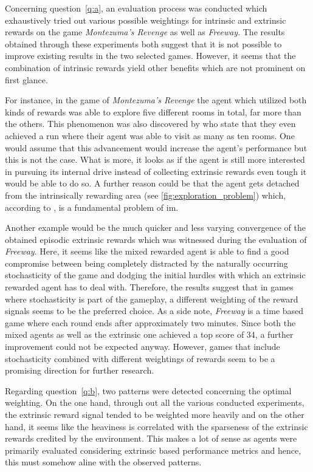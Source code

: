 \documentclass[draft,final]{vutinfth} %
\begin{document}
    Concerning question~\ref{q:a}, an evaluation process was conducted which exhaustively tried out various possible weightings for intrinsic and extrinsic rewards on the game \textit{Montezuma's Revenge} as well as \textit{Freeway}.
    The results obtained through these experiments both suggest that it is not possible to improve existing results in the two selected games.
    However, it seems that the combination of intrinsic rewards yield other benefits which are not prominent on first glance.

    For instance, in the game of \textit{Montezuma's Revenge} the agent which utilized both kinds of rewards was able to explore five different rooms in total, far more than the others.
    This phenomenon was also discovered by \citeauthor{burda_large-scale_2018-1} who state that they even achieved a run where their agent was able to visit as many as ten rooms.
    One would assume that this advancement would increase the agent's performance but this is not the case.
    What is more, it looks as if the agent is still more interested in pursuing its internal drive instead of collecting extrinsic rewards even tough it would be able to do so.
    A further reason could be that the agent gets detached from the intrinsically rewarding area (see \autoref{fig:exploration_problem}) which, according to \citet{ecoffet_go-explore_2019}, is a fundamental problem of \gls{im}.

    Another example would be the much quicker and less varying convergence of the obtained episodic extrinsic rewards which was witnessed during the evaluation of \textit{Freeway}.
    Here, it seems like the mixed rewarded agent is able to find a good compromise between being completely distracted by the naturally occurring stochasticity of the game and dodging the initial hurdles with which an extrinsic rewarded agent has to deal with.
    Therefore, the results suggest that in games where stochasticity is part of the gameplay, a different weighting of the reward signals seems to be the preferred choice.
    As a side note, \textit{Freeway} is a time based game where each round ends after approximately two minutes.
    Since both the mixed agents as well as the extrinsic one achieved a top score of 34, a further improvement could not be expected anyway.
    However, games that include stochasticity combined with different weightings of rewards seem to be a promising direction for further research.

    Regarding question~\ref{q:b}, two patterns were detected concerning the optimal weighting.
    On the one hand, through out all the various conducted experiments, the extrinsic reward signal tended to be weighted more heavily and on the other hand, it seems like the heaviness is correlated with the sparseness of the extrinsic rewards credited by the environment.
    This makes a lot of sense as agents were primarily evaluated considering extrinsic based performance metrics and hence, this must somehow aline with the observed patterns.
\end{document}
